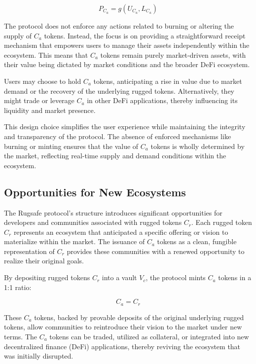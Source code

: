 \documentclass{article}
\begin{document}
\[
P_{C_a} = g(U_{C_a}, L_{C_a})
\]

The protocol does not enforce any actions related to burning or altering the supply of $C_a$ tokens. Instead, the focus is on providing a straightforward receipt mechanism that empowers users to manage their assets independently within the ecosystem. This means that $C_a$ tokens remain purely market-driven assets, with their value being dictated by market conditions and the broader DeFi ecosystem. 

Users may choose to hold $C_a$ tokens, anticipating a rise in value due to market demand or the recovery of the underlying rugged tokens. Alternatively, they might trade or leverage $C_a$ in other DeFi applications, thereby influencing its liquidity and market presence.

This design choice simplifies the user experience while maintaining the integrity and transparency of the protocol. The absence of enforced mechanisms like burning or minting ensures that the value of $C_a$ tokens is wholly determined by the market, reflecting real-time supply and demand conditions within the ecosystem.









\subsection{Opportunities for New Ecosystems}
The Rugsafe protocol's structure introduces significant opportunities for developers and communities associated with rugged tokens $C_r$. Each rugged token $C_r$ represents an ecosystem that anticipated a specific offering or vision to materialize within the market. The issuance of $C_a$ tokens as a clean, fungible representation of $C_r$ provides these communities with a renewed opportunity to realize their original goals.

By depositing rugged tokens $C_r$ into a vault $V_c$, the protocol mints $C_a$ tokens in a 1:1 ratio:

\[
C_a = C_r
\]

These $C_a$ tokens, backed by provable deposits of the original underlying rugged tokens, allow communities to reintroduce their vision to the market under new terms. The $C_a$ tokens can be traded, utilized as collateral, or integrated into new decentralized finance (DeFi) applications, thereby reviving the ecosystem that was initially disrupted.
\end{document}
